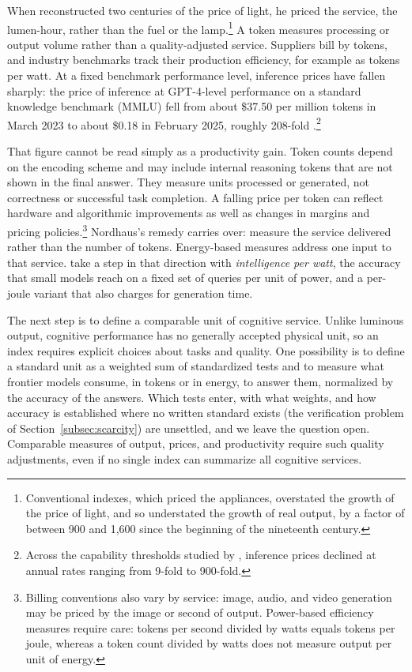 \documentclass[12pt]{article}
\theoremstyle{plain}
\theoremstyle{definition}
\theoremstyle{remark}
\begin{document}
When \citet{Nordhaus1997Lighting} reconstructed two
centuries of the price of light, he priced the service, the lumen-hour,
rather than the fuel or the lamp.\footnote{%
Conventional indexes, which priced the appliances, overstated the growth
of the price of light, and so understated the growth of real output, by
a factor of between 900 and 1,600 since the beginning of the nineteenth
century.} A token measures processing or output volume rather than a
quality-adjusted service. Suppliers bill by tokens, and industry
benchmarks track their production efficiency, for example as tokens per
watt. At a fixed benchmark performance level,
inference prices have fallen sharply: the price of inference at
GPT-4-level performance on a standard knowledge benchmark (MMLU) fell from about
\$37.50 per million tokens in March 2023 to about \$0.18 in February
2025, roughly 208-fold \citep{CottierEtAl2025InferencePrices}.\footnote{%
Across the capability
thresholds studied by \citet{CottierEtAl2025InferencePrices}, inference
prices declined at annual rates ranging from 9-fold to 900-fold.}

That figure cannot be read simply as a productivity gain. Token counts depend on the encoding scheme and may include internal
reasoning tokens that are not shown in the final answer. They measure
units processed or generated, not correctness or successful task
completion. A falling price per token can reflect hardware and
algorithmic improvements as well as changes in margins and pricing
policies.\footnote{%
Billing conventions also vary by service: image, audio, and video
generation may be priced by the image or second of output. Power-based
efficiency measures require care: tokens per second divided by watts
equals tokens per joule, whereas a token count divided by watts does
not measure output per unit of energy.} Nordhaus's remedy
carries over: measure the service delivered rather than the number of
tokens. Energy-based measures address one input to that service.
\citet{SaadFalconEtAl2025IPW}
take a step in that direction with \emph{intelligence per
watt}, the accuracy that small models reach on a fixed set of queries
per unit of power, and a per-joule variant that also charges for
generation time.

The next step is to define a comparable unit of cognitive service.
Unlike luminous output, cognitive performance has no generally accepted
physical unit, so an index requires explicit choices about tasks and
quality.
One possibility is to define a standard unit as a weighted sum of
standardized tests and to measure what frontier models consume, in
tokens or in energy, to answer them, normalized by the accuracy of the
answers. Which tests enter, with what weights, and how accuracy is
established where no written standard exists (the verification problem
of Section~\ref{subsec:scarcity}) are unsettled, and we leave the
question open. Comparable measures of output, prices, and productivity require such
quality adjustments, even if no single index can summarize all
cognitive services.
\end{document}
